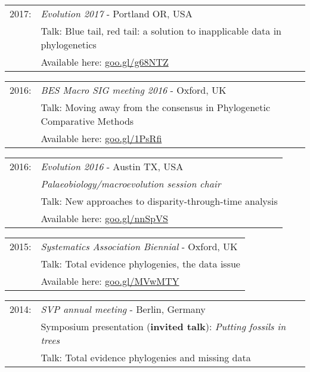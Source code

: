 \documentclass[10pt,a4paper]{article}
\begin{document}
{\begin{tabular}{ll}
2017: & \textit{Evolution 2017} - Portland OR, USA\\
      & Talk: Blue tail, red tail: a solution to inapplicable data in phylogenetics\\
      & Available here: \href{https://figshare.com/articles/Guillerme_Evolution2017_pdf/5140222}{goo.gl/g68NTZ}\\
\end{tabular}
\begin{tabular}{ll}
2016: & \textit{BES Macro SIG meeting 2016} - Oxford, UK\\
      & Talk: Moving away from the consensus in Phylogenetic Comparative Methods\\
      & Available here: \href{https://figshare.com/articles/Guillerme_BESMacro2016_pdf/3478922}{goo.gl/1PsRfi}\\
\end{tabular}
\begin{tabular}{ll}
2016: & \textit{Evolution 2016} - Austin TX, USA\\
& \textit{Palaeobiology/macroevolution session chair}\\
      & Talk: New approaches to disparity-through-time analysis\\
      & Available here: \href{https://figshare.com/articles/New_approaches_to_disparity-through-time_analysis/3437546}{goo.gl/nnSpVS}\\
\end{tabular}
\begin{tabular}{ll}
2015: & \textit{Systematics Association Biennial} - Oxford, UK\\
      & Talk: Total evidence phylogenies, the data issue\\ 
      & Available here: \href{http://www.slideshare.net/ThomasGuillerme/total-evidence-phylogenies-the-missing-data-issue}{goo.gl/MVwMTY}\\
\end{tabular}
\begin{tabular}{ll}
2014: & \textit{SVP annual meeting} - Berlin, Germany\\
      & Symposium presentation (\textbf{invited talk}): \textit{Putting fossils in trees}\\
      & Talk: Total evidence phylogenies and missing data\\

\end{tabular}}
\end{document}
